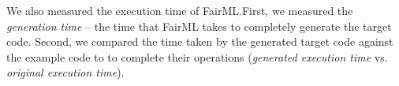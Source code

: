 \documentclass[sigconf,review]{acmart}
\begin{document}
We also measured the execution time of FairML.First, we measured the \textit{generation time} -- the time that FairML takes to completely generate the target code. Second, we compared the time taken by the generated target code against the example code to to complete their operations (\textit{generated execution time} vs. \textit{original execution time}).




	
	
	
	
	
	
	
	
\end{document}
